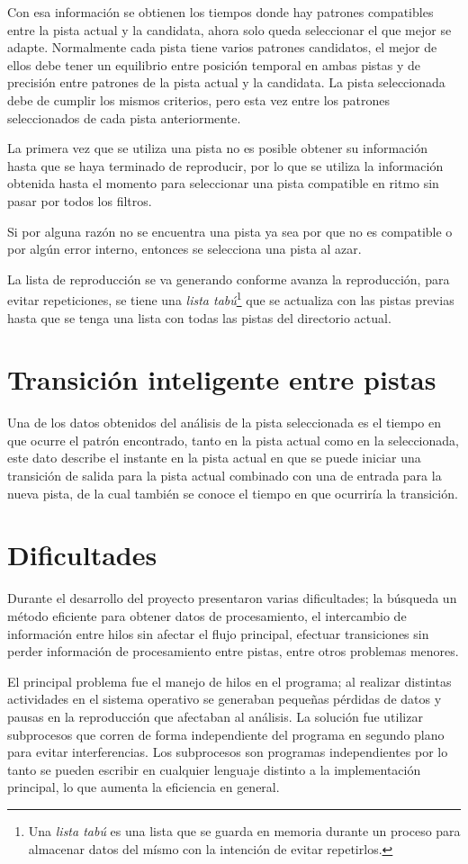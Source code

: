 \noindent Con esa informaci\'on se obtienen los tiempos donde hay patrones compatibles entre la pista actual y la candidata, ahora solo queda seleccionar el que mejor se adapte. Normalmente cada pista tiene varios patrones candidatos, el mejor de ellos debe tener un equilibrio entre posici\'on temporal en ambas pistas y de precisi\'on entre patrones de la pista actual y la candidata. La pista seleccionada debe de cumplir los mismos criterios, pero esta vez entre los patrones seleccionados de cada pista anteriormente.

\noindent La primera vez que se utiliza una pista no es posible obtener su informaci\'on hasta que se haya terminado de reproducir, por lo que se utiliza la informaci\'on obtenida hasta el momento para seleccionar una pista compatible en ritmo sin pasar por todos los filtros.

\noindent Si por alguna raz\'on no se encuentra una pista ya sea por que no es compatible o por alg\'un error interno, entonces se selecciona una pista al azar.

\noindent La lista de reproducci\'on se va generando conforme avanza la reproducci\'on, para evitar repeticiones, se tiene una {\em lista tab\'u}\footnote{Una {\em lista tab\'u} es una lista que se guarda en memoria durante un proceso para almacenar datos del m\'ismo con la intenci\'on de evitar repetirlos.} que se actualiza con las pistas previas hasta que se tenga una lista con todas las pistas del directorio actual.

\section{Transici\'on inteligente entre pistas}

Una de los datos obtenidos del an\'alisis de la pista seleccionada es el tiempo en que ocurre el patr\'on encontrado, tanto en la pista actual como en la seleccionada, este dato describe el instante en la pista actual en que se puede iniciar una transici\'on de salida para la pista actual combinado con una de entrada para la nueva pista, de la cual tambi\'en se conoce el tiempo en que ocurrir\'ia la transici\'on.

\section{Dificultades}

Durante el desarrollo del proyecto presentaron varias dificultades; la b\'usqueda un m\'etodo eficiente para obtener datos de procesamiento, el intercambio de informaci\'on entre hilos sin afectar el flujo principal, efectuar transiciones sin perder informaci\'on de procesamiento entre pistas, entre otros problemas menores.

\noindent El principal problema fue el manejo de hilos en el programa; al realizar distintas actividades en el sistema operativo se generaban peque\~nas p\'erdidas de datos y pausas en la reproducci\'on que afectaban al an\'alisis. La soluci\'on fue utilizar subprocesos que corren de forma independiente del programa en segundo plano para evitar interferencias. Los subprocesos son programas independientes por lo tanto se pueden escribir en cualquier lenguaje distinto a la implementaci\'on principal, lo que aumenta la eficiencia en general.